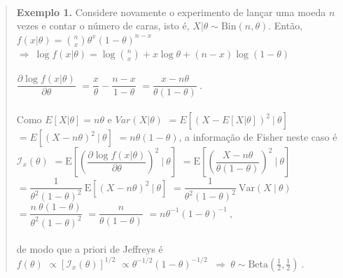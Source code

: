 \documentclass[
]{book}
\begin{document}
\(~\)

\begin{quote}
\textbf{Exemplo 1.} Considere novamente o experimento de lançar uma moeda \(n\) vezes e contar o número de caras, isto é, \(X|\theta \sim \text{Bin}(n,\theta)\). Então,\\
\(f(x|\theta)=\displaystyle\binom{n}{x}\theta^x(1-\theta)^{n-x}\)
\(\Longrightarrow~ \log f(x|\theta)=\log\binom{n}{x}+x\log\theta+(n-x)\log(1-\theta)\)\\
\(~\)\\
\(\dfrac{\partial\log f(x|\theta)}{\partial\theta}\)
\(=\dfrac{x}{\theta}-\dfrac{n-x}{1-\theta}\)
\(=\dfrac{x-n\theta}{\theta(1-\theta)}~.\)\\
\(~\)\\
Como \(E\left[X|\theta\right]=n\theta\) e \(Var(X|\theta)\) \(=E\left[\left(X-E\left[X|\theta\right]\right)^2~\Big|~\theta\right]\) \(=E\left[\left(X-n\theta\right)^2~\Big|~\theta\right]\) \(=n\theta(1-\theta)\), a informação de Fisher neste caso é\\
\(\mathcal{I}_x(\theta)\) \(=\text{E}\left[\left(\dfrac{\partial\log f(x|\theta)}{\partial\theta}\right)^2~\bigg|~\theta\right]\) \(=\text{E}\left[\left(\dfrac{X-n\theta}{\theta(1-\theta)}\right)^2~\bigg|~\theta\right]\)
\(=\dfrac{1}{\theta^2(1-\theta)^2}~\text{E}\left[\left(X-n\theta\right)^2~|~\theta\right]\)
\(=\dfrac{1}{\theta^2(1-\theta)^2}~\text{Var}\left(X~|~\theta\right)\)
\(=\dfrac{n~\theta(1-\theta)}{\theta^2(1-\theta)^2}\)
\(=\dfrac{n}{\theta(1-\theta)}\) \(=n\theta^{-1}(1-\theta)^{-1}~,\)\\
\(~\)\\
de modo que a priori de Jeffreys é\\
\(f(\theta)\) \(\propto\left[\mathcal{I}_x(\theta)\right]^{1/2}\)
\(\propto\theta^{-1/2}(1-\theta)^{-1/2}\) \(~\Longrightarrow~ \theta \sim \text{Beta}\left(\frac{1}{2},\frac{1}{2}\right)~.\)
\end{quote}

\(~\)
\end{document}
